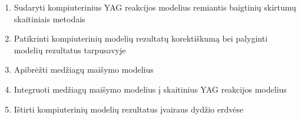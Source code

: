\begin{enumerate}
  
    \item Sudaryti kompiuterinius YAG reakcijos modelius remiantis baigtinių skirtumų skaitiniais metodais
    \item Patikrinti kompiuterinių modelių rezultatų korektiškumą bei palyginti modelių rezultatus tarpusavyje
    \item Apibrėžti medžiagų maišymo modelius
    \item Integruoti medžiagų maišymo modelius į skaitinius YAG reakcijos modelius
    \item Ištirti kompiuterinių modelių rezultatus įvairaus dydžio erdvėse
\end{enumerate}
